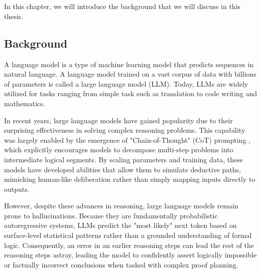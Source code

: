 \chapter{\babSatu}
\label{bab:1}
In this chapter, we will introduce the background that we will discuss in this thesis.

\section{Background}
\label{sec:latarBelakang}
A language model is a type of machine learning model that predicts sequences in natural language. A language model trained on a vast corpus of data with billions of parameters is called a large language model (LLM). Today, LLMs are widely utilized for tasks ranging from simple task such as translation to code writing and mathematics. 

In recent years, large language models have gained popularity due to their surprising effectiveness in solving complex reasoning problems. This capability was largely enabled by the emergence of "Chain-of-Thought" (CoT) prompting \citep{DBLP:conf/nips/Wei0SBIXCLZ22}, which explicitly encourages models to decompose multi-step problems into intermediate logical segments. By scaling parameters and training data, these models have developed abilities that allow them to simulate deductive paths, mimicking human-like deliberation rather than simply mapping inputs directly to outputs.

However, despite these advances in reasoning, large language models remain prone to hallucinations. Because they are fundamentally probabilistic autoregressive systems, LLMs predict the "most likely" next token based on surface-level statistical patterns rather than a grounded understanding of formal logic. Consequently, an error in an earlier reasoning steps can lead the rest of the reasoning steps astray, leading the model to confidently assert logically impossible or factually incorrect conclusions when tasked with complex proof planning.

